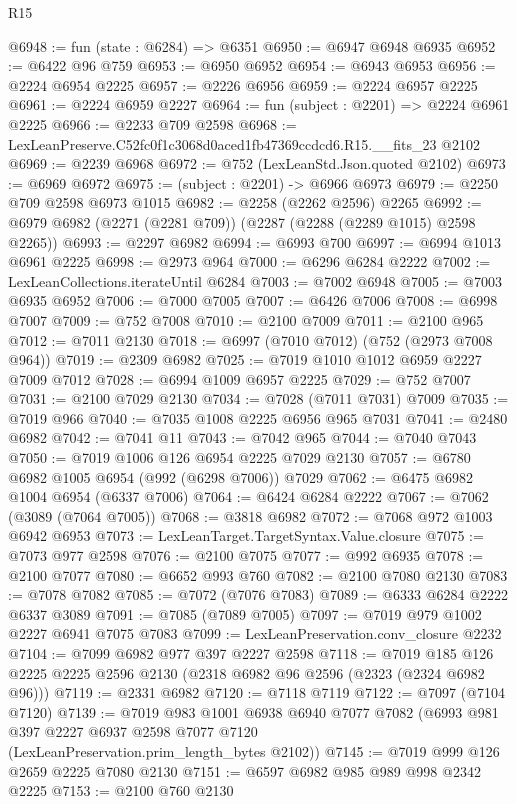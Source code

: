 \begin{lexlean}{R15}
\begin{coremodule}
@6948 := fun (state : @6284) => @6351
@6950 := @6947 @6948 @6935
@6952 := @6422 @96 @759
@6953 := @6950 @6952
@6954 := @6943 @6953
@6956 := @2224 @6954 @2225
@6957 := @2226 @6956
@6959 := @2224 @6957 @2225
@6961 := @2224 @6959 @2227
@6964 := fun (subject : @2201) => @2224 @6961 @2225
@6966 := @2233 @709 @2598
@6968 := LexLeanPreserve.C52fc0f1c3068d0aced1fb47369ccdcd6.R15.__fits_23 @2102
@6969 := @2239 @6968
@6972 := @752 (LexLeanStd.Json.quoted @2102)
@6973 := @6969 @6972
@6975 := (subject : @2201) -> @6966 @6973
@6979 := @2250 @709 @2598 @6973 @1015
@6982 := @2258 (@2262 @2596) @2265
@6992 := @6979 @6982 (@2271 (@2281 @709)) (@2287 (@2288 (@2289 @1015) @2598 @2265))
@6993 := @2297 @6982
@6994 := @6993 @700
@6997 := @6994 @1013 @6961 @2225
@6998 := @2973 @964
@7000 := @6296 @6284 @2222
@7002 := LexLeanCollections.iterateUntil @6284
@7003 := @7002 @6948
@7005 := @7003 @6935 @6952
@7006 := @7000 @7005
@7007 := @6426 @7006
@7008 := @6998 @7007
@7009 := @752 @7008
@7010 := @2100 @7009
@7011 := @2100 @965
@7012 := @7011 @2130
@7018 := @6997 (@7010 @7012) (@752 (@2973 @7008 @964))
@7019 := @2309 @6982
@7025 := @7019 @1010 @1012 @6959 @2227 @7009 @7012
@7028 := @6994 @1009 @6957 @2225
@7029 := @752 @7007
@7031 := @2100 @7029 @2130
@7034 := @7028 (@7011 @7031) @7009
@7035 := @7019 @966
@7040 := @7035 @1008 @2225 @6956 @965 @7031
@7041 := @2480 @6982
@7042 := @7041 @11
@7043 := @7042 @965
@7044 := @7040 @7043
@7050 := @7019 @1006 @126 @6954 @2225 @7029 @2130
@7057 := @6780 @6982 @1005 @6954 (@992 (@6298 @7006)) @7029
@7062 := @6475 @6982 @1004 @6954 (@6337 @7006)
@7064 := @6424 @6284 @2222
@7067 := @7062 (@3089 (@7064 @7005))
@7068 := @3818 @6982
@7072 := @7068 @972 @1003 @6942 @6953
@7073 := LexLeanTarget.TargetSyntax.Value.closure
@7075 := @7073 @977 @2598
@7076 := @2100 @7075
@7077 := @992 @6935
@7078 := @2100 @7077
@7080 := @6652 @993 @760
@7082 := @2100 @7080 @2130
@7083 := @7078 @7082
@7085 := @7072 (@7076 @7083)
@7089 := @6333 @6284 @2222 @6337 @3089
@7091 := @7085 (@7089 @7005)
@7097 := @7019 @979 @1002 @2227 @6941 @7075 @7083
@7099 := LexLeanPreservation.conv_closure @2232
@7104 := @7099 @6982 @977 @397 @2227 @2598
@7118 := @7019 @185 @126 @2225 @2225 @2596 @2130 (@2318 @6982 @96 @2596 (@2323 (@2324 @6982 @96)))
@7119 := @2331 @6982
@7120 := @7118 @7119
@7122 := @7097 (@7104 @7120)
@7139 := @7019
    @983
    @1001
    @6938
    @6940
    @7077
    @7082
    (@6993 @981 @397 @2227 @6937 @2598 @7077 @7120 (LexLeanPreservation.prim_length_bytes @2102))
@7145 := @7019 @999 @126 @2659 @2225 @7080 @2130
@7151 := @6597 @6982 @985 @989 @998 @2342 @2225
@7153 := @2100 @760 @2130

\end{coremodule}
\end{lexlean}
